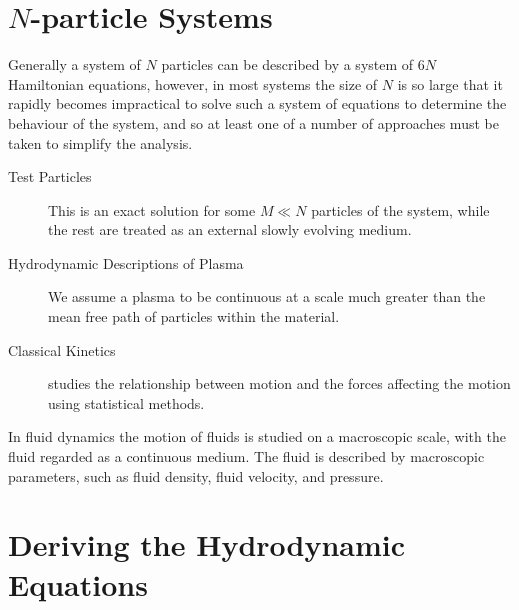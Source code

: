 
\section{$N$-particle Systems}
\label{sec:n-particle-systems}

Generally a system of $N$ particles can be described by a system of
$6N$ Hamiltonian equations, however, in most systems the size of $N$
is so large that it rapidly becomes impractical to solve such a system
of equations to determine the behaviour of the system, and so at least
one of a number of approaches must be taken to simplify the analysis.

\begin{description}
\item[Test Particles] This is an exact solution for some $M \ll N$
  particles of the system, while the rest are treated as an external
  slowly evolving medium.
\item[Hydrodynamic Descriptions of Plasma] We assume a plasma to be
  continuous at a scale much greater than the mean free path of
  particles within the material.
\item[Classical Kinetics] studies the relationship between motion and
  the forces affecting the motion using statistical methods.
\end{description}

In fluid dynamics the motion of fluids is studied on a macroscopic
scale, with the fluid regarded as a continuous medium. The fluid is
described by macroscopic parameters, such as fluid density, fluid
velocity, and pressure.

\section{Deriving the Hydrodynamic Equations}
\label{sec:deriv-hydr-equat}

